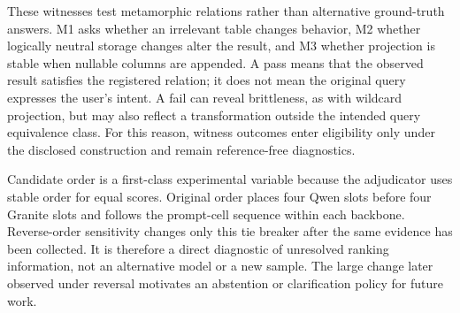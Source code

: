 \documentclass[applsci,article,submit,moreauthors]{Definitions/mdpi}
\begin{document}
These witnesses test metamorphic relations rather than alternative ground-truth answers. M1 asks whether an irrelevant table changes behavior, M2 whether logically neutral storage changes alter the result, and M3 whether projection is stable when nullable columns are appended. A pass means that the observed result satisfies the registered relation; it does not mean the original query expresses the user's intent. A fail can reveal brittleness, as with wildcard projection, but may also reflect a transformation outside the intended query equivalence class. For this reason, witness outcomes enter eligibility only under the disclosed construction and remain reference-free diagnostics.

Candidate order is a first-class experimental variable because the adjudicator uses stable order for equal scores. Original order places four Qwen slots before four Granite slots and follows the prompt-cell sequence within each backbone. Reverse-order sensitivity changes only this tie breaker after the same evidence has been collected. It is therefore a direct diagnostic of unresolved ranking information, not an alternative model or a new sample. The large change later observed under reversal motivates an abstention or clarification policy for future work.
\end{document}
